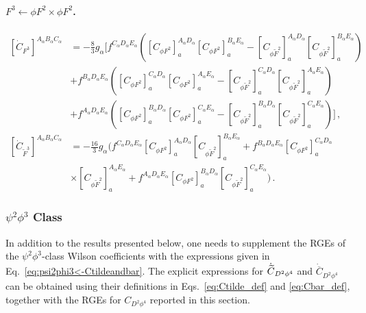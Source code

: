 \paragraph{\texorpdfstring{$F^3\leftarrow \phi F^2 \times \phi F^2$}{F3fromphiF2xphiF2}.}
\label{par:F3<-phiF2xphiF2}

\begin{align}
    \left[\dot C_{F^3}\right]^{A_\alpha B_\alpha C_\alpha} &= -\frac{8}{3}g_\alpha \bigg[ 
    f^{C_\alpha D_\alpha E_\alpha}\left( \left[C_{\phi F^2}\right]^{A_\alpha D_\alpha}_a \left[C_{\phi F^2}\right]^{B_\alpha E_\alpha}_a - \left[ C_{\phi \widetilde F^2}\right]^{A_\alpha D_\alpha}_a \left[ C_{\phi \widetilde F^2}\right]^{B_\alpha E_\alpha}_a \right) \nonumber \\
    &+
    f^{B_\alpha D_\alpha E_\alpha}\left( \left[C_{\phi F^2}\right]^{C_\alpha D_\alpha}_a \left[C_{\phi F^2}\right]^{A_\alpha E_\alpha}_a - \left[ C_{\phi \widetilde F^2}\right]^{C_\alpha D_\alpha}_a \left[ C_{\phi \widetilde F^2}\right]^{A_\alpha E_\alpha}_a \right)\label{eq:F3<-phiF2xphiF2}\\
    &+
    f^{A_\alpha D_\alpha E_\alpha}\left( \left[C_{\phi F^2}\right]^{B_\alpha D_\alpha}_a \left[C_{\phi F^2}\right]^{C_\alpha E_\alpha}_a - \left[ C_{\phi \widetilde F^2}\right]^{B_\alpha D_\alpha}_a \left[ C_{\phi \widetilde F^2}\right]^{C_\alpha E_\alpha}_a \right)
    \bigg]\nonumber \,,
\\
\left[\dot{ C}_{\widetilde F^3}\right]^{A_\alpha B_\alpha C_\alpha} &= -\frac{16}{3}g_\alpha \bigg( 
f^{C_\alpha D_\alpha E_\alpha} \left[C_{\phi F^2}\right]^{A_\alpha D_\alpha}_a \left[ C_{\phi \widetilde F^2}\right]^{B_\alpha E_\alpha}_a +f^{B_\alpha D_\alpha E_\alpha} \left[C_{\phi F^2}\right]^{C_\alpha D_\alpha}_a \nonumber   \\
&\times \left[ C_{\phi \widetilde F^2}\right]^{A_\alpha E_\alpha}_a +
f^{A_\alpha D_\alpha E_\alpha} \left[C_{\phi F^2}\right]^{B_\alpha D_\alpha}_a \left[ C_{\phi \widetilde F^2}\right]^{C_\alpha E_\alpha}_a 
\bigg)\,. 
\label{eq:F3tilde<-phiF2xphiF2}
\end{align}
%

\subsubsection{\texorpdfstring{$\psi^2 \phi^3$}{psi2phi3} Class}
\label{sec:gEFT_results_psi2phi3}

In addition to the results presented below, one needs to supplement the RGEs of the $\psi^2\phi^3$-class Wilson coefficients with the expressions given in Eq.~\eqref{eq:psi2phi3<-Ctildeandbar}.
The explicit expressions for $\dot{\widetilde{C}}_{D^2\phi^4}$ and $\dot{\overline C}_{D^2\phi^4}$ can be obtained using their definitions in Eqs.~\eqref{eq:Ctilde_def} and \eqref{eq:Cbar_def}, together with the RGEs for $C_{D^2\phi^4}$ reported in this section.

